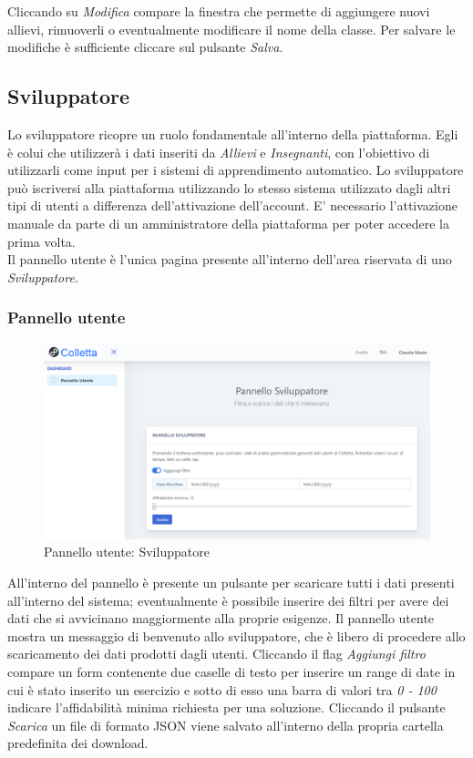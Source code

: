         	
Cliccando su \textit{Modifica} compare la finestra che permette di aggiungere nuovi allievi, rimuoverli o eventualmente modificare il nome della classe. Per salvare le modifiche è sufficiente cliccare sul pulsante \textit{Salva}.
        
	\newpage
    \subsection{Sviluppatore}
    Lo sviluppatore ricopre un ruolo fondamentale all'interno della piattaforma. Egli è colui che utilizzerà i dati inseriti da \textit{Allievi} e \textit{Insegnanti}, con l'obiettivo di utilizzarli come input per i sistemi di apprendimento automatico.
    Lo sviluppatore può iscriversi alla piattaforma utilizzando lo stesso sistema utilizzato dagli altri tipi di utenti a differenza dell'attivazione dell'account. E' necessario l'attivazione manuale da parte di un amministratore della piattaforma per poter accedere la prima volta. 
        	 \\Il pannello utente è l'unica pagina presente all'interno dell'area riservata di uno \textit{Sviluppatore}.
   
    	\subsubsection{Pannello utente}
    				\begin{figure}[H]
				\centering
				\includegraphics[width=17cm]{sez/img/sviluppatore/panelloutente.PNG}
				\caption{Pannello utente: Sviluppatore}\label{fig:1}
			\end{figure}
			 All'interno del pannello è presente un pulsante per scaricare tutti i dati presenti all'interno del sistema; eventualmente è possibile inserire dei filtri per avere dei dati che si avvicinano maggiormente alla proprie esigenze.
    	  Il pannello utente mostra un messaggio di benvenuto allo sviluppatore, che è libero di procedere allo scaricamento dei dati prodotti dagli utenti.
    	 Cliccando il flag \textit{Aggiungi filtro} compare un form contenente due caselle di testo per inserire un range di date in cui è stato inserito un esercizio e sotto di esso una barra di valori tra \textit{0 - 100} indicare l'affidabilità minima richiesta per una soluzione.
    	 Cliccando il pulsante \textit{Scarica} un file di formato {JSON} viene salvato all'interno della propria cartella predefinita dei download.

